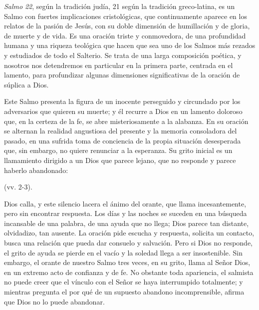 

\begin{body} 
 \emph{Salmo} \emph{22}, según la tradición judía, 21 según la tradición greco-latina, es un Salmo con fuertes implicaciones cristológicas, que continuamente aparece en los relatos de la pasión de Jesús, con su doble dimensión de humillación y de gloria, de muerte y de vida. Es una oración triste y conmovedora, de una profundidad humana y una riqueza teológica que hacen que sea uno de los Salmos más rezados y estudiados de todo el Salterio. Se trata de una larga composición poética, y nosotros nos detendremos en particular en la primera parte, centrada en el lamento, para profundizar algunas dimensiones significativas de la oración de súplica a Dios. 

Este Salmo presenta la figura de un inocente perseguido y circundado por los adversarios que quieren su muerte; y él recurre a Dios en un lamento doloroso que, en la certeza de la fe, se abre misteriosamente a la alabanza. En su oración se alternan la realidad angustiosa del presente y la memoria consoladora del pasado, en una sufrida toma de conciencia de la propia situación desesperada que, sin embargo, no quiere renunciar a la esperanza. Su grito inicial es un llamamiento dirigido a un Dios que parece lejano, que no responde y parece haberlo abandonado: 

 (vv. 2-3). 

Dios calla, y este silencio lacera el ánimo del orante, que llama incesantemente, pero sin encontrar respuesta. Los días y las noches se suceden en una búsqueda incansable de una palabra, de una ayuda que no llega; Dios parece tan distante, olvidadizo, tan ausente. La oración pide escucha y respuesta, solicita un contacto, busca una relación que pueda dar consuelo y salvación. Pero si Dios no responde, el grito de ayuda se pierde en el vacío y la soledad llega a ser insostenible. Sin embargo, el orante de nuestro Salmo tres veces, en su grito, llama al Señor  Dios, en un extremo acto de confianza y de fe. No obstante toda apariencia, el salmista no puede creer que el vínculo con el Señor se haya interrumpido totalmente; y mientras pregunta el por qué de un supuesto abandono incomprensible, afirma que  Dios no lo puede abandonar. 


\end{body}
